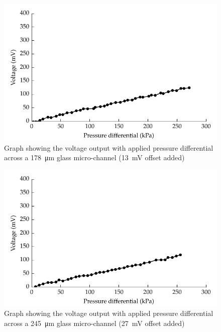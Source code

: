 \begin{figure}
    \centering
    \includegraphics{content/pt1/01-PowerHarvesting/graphics/streamingCell_voltVsPress_178um_out}
    \caption{\label{fig:VvsP_178um}Graph showing the voltage output with applied pressure differential across a \SI{178}{\micro\metre} glass micro-channel (\SI{13}{\milli\volt} offset added)}
\end{figure}

\begin{figure}
    \centering
    \includegraphics{content/pt1/01-PowerHarvesting/graphics/streamingCell_voltVsPress_245um_out}
    \caption{\label{fig:VvsP_245um}Graph showing the voltage output with applied pressure differential across a \SI{245}{\micro\metre} glass micro-channel (\SI{27}{\milli\volt} offset added)}
\end{figure}
